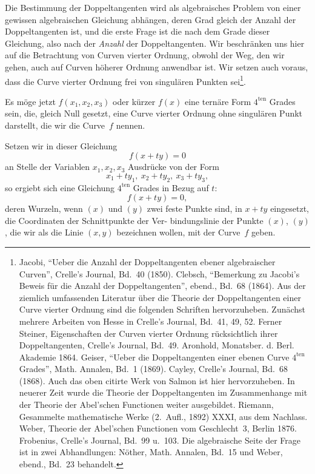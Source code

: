 \documentclass[12pt,a4paper]{article}
\theoremstyle{definition}
\begin{document}
Die Bestimmung der Doppeltangenten wird als algebraisches
Problem von einer gewissen algebraischen Gleichung abhängen,
deren Grad gleich der Anzahl der Doppeltangenten ist, und die
erste Frage ist die nach dem Grade dieser Gleichung, also nach
der \textit{Anzahl} der Doppeltangenten. Wir beschränken uns hier auf
die Betrachtung von Curven vierter Ordnung, obwohl der Weg,
den wir gehen, auch auf Curven höherer Ordnung anwendbar
ist. Wir setzen auch voraus, dass die Curve vierter Ordnung
frei von singulären Punkten sei\footnote{Jacobi, ``Ueber die Anzahl der Doppeltangenten ebener algebraischer Curven'', Crelle's Journal, Bd.~40 (1850). Clebsch, ``Bemerkung zu Jacobi's Beweis für die Anzahl der Doppeltangenten'', ebend., Bd.~68 (1864). Aus der ziemlich umfassenden Literatur über die Theorie der Doppeltangenten einer Curve vierter Ordnung sind die folgenden Schriften hervorzuheben. Zunächst mehrere Arbeiten von Hesse in Crelle's Journal, Bd.~41, 49, 52. Ferner Steiner, Eigenschaften der Curven vierter Ordnung rücksichtlich ihrer Doppeltangenten, Crelle's Journal, Bd.~49. Aronhold, Monatsber. d. Berl. Akademie 1864. Geiser, ``Ueber die Doppeltangenten einer ebenen Curve $4^{\text{ten}}$ Grades'', Math. Annalen, Bd.~1 (1869). Cayley, Crelle's Journal, Bd.~68 (1868). Auch das oben citirte Werk von Salmon ist hier hervorzuheben. In neuerer Zeit wurde die Theorie der Doppeltangenten im Zusammenhange mit der Theorie der Abel'schen Functionen weiter ausgebildet. Riemann, Gesammelte mathematische Werke (2.~Aufl., 1892) XXXI, aus dem Nachlass. Weber, Theorie der Abel'schen Functionen vom Geschlecht~3, Berlin 1876. Frobenius, Crelle's Journal, Bd.~99 u.~103. Die algebraische Seite der Frage ist in zwei Abhandlungen: Nöther, Math. Annalen, Bd.~15 und Weber, ebend., Bd.~23 behandelt.}.

Es möge jetzt $f(x_1, x_2, x_3)$ oder kürzer $f(x)$ eine ternäre
Form $4^{\text{ten}}$ Grades sein, die, gleich Null gesetzt, eine Curve vierter
Ordnung ohne singulären Punkt darstellt, die wir die Curve~$f$
nennen.

Setzen wir in dieser Gleichung
\begin{equation}\label{eq:1}
f(x + ty) = 0
\end{equation}
an Stelle der Variablen $x_1, x_2, x_3$ Ausdrücke von der Form
\[x_1 + ty_1,\ x_2 + ty_2,\ x_3 + ty_3,\]
so ergiebt sich eine Gleichung $4^{\text{ten}}$ Grades in Bezug auf $t$:
\begin{equation}\label{eq:2}
f(x + ty) = 0,
\end{equation}
deren Wurzeln, wenn $(x)$ und $(y)$ zwei feste Punkte sind, in
$x + ty$ eingesetzt, die Coordinaten der Schnittpunkte der Ver-
bindungslinie der Punkte $(x)$, $(y)$, die wir als die Linie $(x,y)$
bezeichnen wollen, mit der Curve~$f$ geben.
\end{document}

